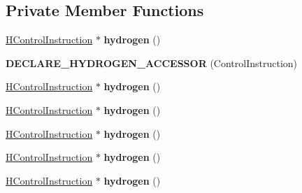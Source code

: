 \subsection*{Private Member Functions}
\begin{DoxyCompactItemize}
\item 
\hyperlink{classv8_1_1internal_1_1_h_control_instruction}{H\+Control\+Instruction} $\ast$ {\bfseries hydrogen} ()\hypertarget{classv8_1_1internal_1_1_l_control_instruction_a4affc35e70d25589f0db7daa2bbca908}{}\label{classv8_1_1internal_1_1_l_control_instruction_a4affc35e70d25589f0db7daa2bbca908}

\item 
{\bfseries D\+E\+C\+L\+A\+R\+E\+\_\+\+H\+Y\+D\+R\+O\+G\+E\+N\+\_\+\+A\+C\+C\+E\+S\+S\+OR} (Control\+Instruction)\hypertarget{classv8_1_1internal_1_1_l_control_instruction_a9d90de190defb28957288a501e3e0c2f}{}\label{classv8_1_1internal_1_1_l_control_instruction_a9d90de190defb28957288a501e3e0c2f}

\item 
\hyperlink{classv8_1_1internal_1_1_h_control_instruction}{H\+Control\+Instruction} $\ast$ {\bfseries hydrogen} ()\hypertarget{classv8_1_1internal_1_1_l_control_instruction_a4affc35e70d25589f0db7daa2bbca908}{}\label{classv8_1_1internal_1_1_l_control_instruction_a4affc35e70d25589f0db7daa2bbca908}

\item 
\hyperlink{classv8_1_1internal_1_1_h_control_instruction}{H\+Control\+Instruction} $\ast$ {\bfseries hydrogen} ()\hypertarget{classv8_1_1internal_1_1_l_control_instruction_a4affc35e70d25589f0db7daa2bbca908}{}\label{classv8_1_1internal_1_1_l_control_instruction_a4affc35e70d25589f0db7daa2bbca908}

\item 
\hyperlink{classv8_1_1internal_1_1_h_control_instruction}{H\+Control\+Instruction} $\ast$ {\bfseries hydrogen} ()\hypertarget{classv8_1_1internal_1_1_l_control_instruction_a4affc35e70d25589f0db7daa2bbca908}{}\label{classv8_1_1internal_1_1_l_control_instruction_a4affc35e70d25589f0db7daa2bbca908}

\item 
\hyperlink{classv8_1_1internal_1_1_h_control_instruction}{H\+Control\+Instruction} $\ast$ {\bfseries hydrogen} ()\hypertarget{classv8_1_1internal_1_1_l_control_instruction_a4affc35e70d25589f0db7daa2bbca908}{}\label{classv8_1_1internal_1_1_l_control_instruction_a4affc35e70d25589f0db7daa2bbca908}

\item 
\hyperlink{classv8_1_1internal_1_1_h_control_instruction}{H\+Control\+Instruction} $\ast$ {\bfseries hydrogen} ()\hypertarget{classv8_1_1internal_1_1_l_control_instruction_a4affc35e70d25589f0db7daa2bbca908}{}\label{classv8_1_1internal_1_1_l_control_instruction_a4affc35e70d25589f0db7daa2bbca908}


\end{DoxyCompactItemize}
